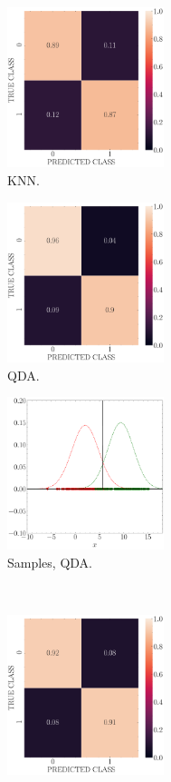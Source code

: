 \documentclass[12pt, a4 paper]{article}
\begin{document}
\begin{figure}[!htbp]
\centering
    \begin{subfigure}[!htbp]{0.24\textwidth}
       \centering
       \includegraphics[width=1.8in]{../results/ex3/conf_mtx_KNN_dataset_P3a_size_199.pdf}
       \caption{KNN.}
       \label{fig:KNN_P3a}
    \end{subfigure}
\quad \quad    
    \begin{subfigure}[!htbp]{0.24\textwidth}
       \centering
       \includegraphics[width=1.8in]{../results/ex3/conf_mtx_QD_ML_dataset_P3a_size_199.pdf}
       \caption{QDA.}
       \label{fig:QDA_P3a}
    \end{subfigure}
\quad \quad
    \begin{subfigure}[!htbp]{0.24\textwidth}
       \centering
       \includegraphics[width=1.8in]{../results/ex3/samples_QD_ML_dataset_P3a_size_199.pdf}
       \caption{Samples, QDA.}
       \label{fig:DF_QDA_P3a}
    \end{subfigure}
\\
    \begin{subfigure}[!htbp]{0.24\textwidth}
       \centering
       \includegraphics[width=1.8in]{../results/ex3/conf_mtx_GMM_dataset_P3a_size_199.pdf}

\end{subfigure}
\end{figure}
\end{document}
